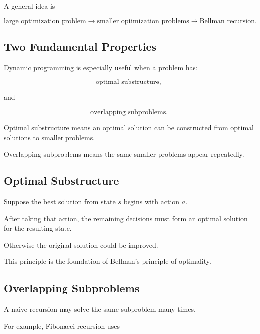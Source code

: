 A general idea is

\[
\boxed{
\text{large optimization problem}
\rightarrow
\text{smaller optimization problems}
\rightarrow
\text{Bellman recursion}.
}
\]

\subsection{Two Fundamental Properties}
\label{subsec:dynamic-programming-properties}

Dynamic programming is especially useful when a problem has:

\[
\boxed{
\text{optimal substructure},
}
\]

and

\[
\boxed{
\text{overlapping subproblems}.
}
\]

Optimal substructure means an optimal solution can be constructed from
optimal solutions to smaller problems.

Overlapping subproblems means the same smaller problems appear repeatedly.

\subsection{Optimal Substructure}
\label{subsec:optimal-substructure}

Suppose the best solution from state \(s\) begins with action \(a\).

After taking that action, the remaining decisions must form an optimal
solution for the resulting state.

Otherwise the original solution could be improved.

This principle is the foundation of Bellman's principle of optimality.

\subsection{Overlapping Subproblems}
\label{subsec:overlapping-subproblems}

A naive recursion may solve the same subproblem many times.

For example, Fibonacci recursion uses

